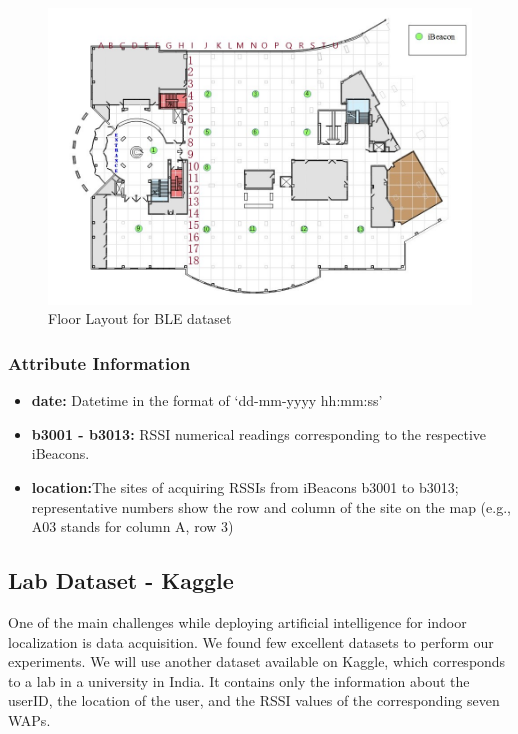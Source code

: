 \documentclass[a4paper,singleside,12pt]{report} %
\begin{document}
			\begin{figure}[htb!]
			\centerline{\includegraphics[width=1\textwidth]{./figures/ble_floor_layout.png}}
			\caption{Floor Layout for BLE dataset}
			\label{fig3.2}
			\end{figure}

			\subsubsection{Attribute Information}
				\begin{itemize}
				\item  \textbf{date:} Datetime in the format of ‘dd-mm-yyyy hh:mm:ss’
				\item  \textbf{b3001 - b3013:} RSSI numerical readings corresponding to the respective iBeacons.
				\item  \textbf{location:}The sites of acquiring RSSIs from iBeacons b3001 to b3013; representative numbers show the row and column of the site on the map (e.g., A03 stands for column A, row 3)
				\end{itemize}
	
			\subsection{Lab Dataset - Kaggle}
				One of the main challenges while deploying artificial intelligence for indoor localization is data acquisition. 
				We found few excellent datasets to perform our experiments. 
				We will use another dataset available on Kaggle, which corresponds to a lab in a university in India. 
				It contains only the information about the userID, the location of the user, and the RSSI values of the corresponding seven WAPs. 
\end{document}
